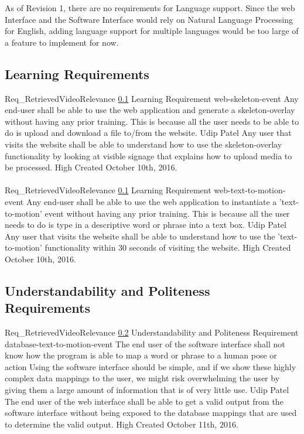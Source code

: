 \documentclass{scrreprt}
\begin{document}
As of Revision 1, there are no requirements for Language support. Since the web Interface and the Software Interface would rely on Natural Language Processing for English, adding language support for multiple languages would be too large of a feature to implement for now.

\subsection{Learning Requirements}
\label{req-learning}

\requirement
{Req_RetrievedVideoRelevance}
{\ref{req-learning} Learning Requirement}
{web-skeleton-event}
{Any end-user shall be able to use the web application and generate a skeleton-overlay without having any prior training.}
{This is because all the user needs to be able to do is upload and download a file to/from the website.}
{Udip Patel}
{Any user that visits the website shall be able to understand how to use the skeleton-overlay functionality by looking at visible signage that explains how to upload media to be processed.}
{High}
{Created October 10th, 2016.}
\\ \\

\requirement
{Req_RetrievedVideoRelevance}
{\ref{req-learning} Learning Requirement}
{web-text-to-motion-event}
{Any end-user shall be able to use the web application to instantiate a 'text-to-motion' event without having any prior training.}
{This is because all the user needs to do is type in a descriptive word or phrase into a text box.}
{Udip Patel}
{Any user that visits the website shall be able to understand how to use the 'text-to-motion' functionality within 30 seconds of visiting the website.}
{High}
{Created October 10th, 2016.}


\subsection{Understandability and Politeness Requirements}
\label{req-understandability-politeness}

\requirement
{Req_RetrievedVideoRelevance}
{\ref{req-understandability-politeness} Understandability and Politeness Requirement}
{database-text-to-motion-event}
{The end user of the software interface shall not know how the program is able
to map a word or phrase to a human pose or action}
{Using the software interface should be simple, and if we show these highly
complex data mappings to the user, we might risk overwhelming the user by
giving them a large amount of information that is of very little use.}
{Udip Patel}
{The end user of the web interface shall be able to get a valid output from the
software interface without being exposed to the database mappings that are used
to determine the valid output.}
{High}
{Created October 11th, 2016.}
\end{document}
